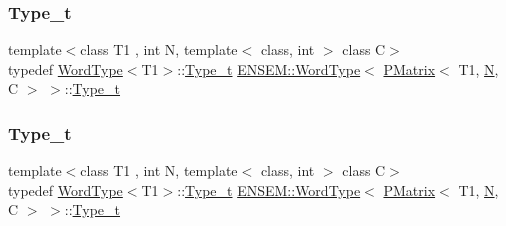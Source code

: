 \subsubsection{\texorpdfstring{Type\_t}{Type\_t}\hspace{0.1cm}{\footnotesize\ttfamily [1/3]}}
{\footnotesize\ttfamily template$<$class T1 , int N, template$<$ class, int $>$ class C$>$ \\
typedef \mbox{\hyperlink{structENSEM_1_1WordType}{Word\+Type}}$<$T1$>$\+::\mbox{\hyperlink{structENSEM_1_1WordType_3_01PMatrix_3_01T1_00_01N_00_01C_01_4_01_4_a892bcf86195d7872e78b5a8b6a1e1734}{Type\+\_\+t}} \mbox{\hyperlink{structENSEM_1_1WordType}{E\+N\+S\+E\+M\+::\+Word\+Type}}$<$ \mbox{\hyperlink{classENSEM_1_1PMatrix}{P\+Matrix}}$<$ T1, \mbox{\hyperlink{adat__devel_2lib_2hadron_2operator__name__util_8cc_a7722c8ecbb62d99aee7ce68b1752f337}{N}}, C $>$ $>$\+::\mbox{\hyperlink{structENSEM_1_1WordType_3_01PMatrix_3_01T1_00_01N_00_01C_01_4_01_4_a892bcf86195d7872e78b5a8b6a1e1734}{Type\+\_\+t}}}

\mbox{\label{structENSEM_1_1WordType_3_01PMatrix_3_01T1_00_01N_00_01C_01_4_01_4_a892bcf86195d7872e78b5a8b6a1e1734}} 
\subsubsection{\texorpdfstring{Type\_t}{Type\_t}\hspace{0.1cm}{\footnotesize\ttfamily [2/3]}}
{\footnotesize\ttfamily template$<$class T1 , int N, template$<$ class, int $>$ class C$>$ \\
typedef \mbox{\hyperlink{structENSEM_1_1WordType}{Word\+Type}}$<$T1$>$\+::\mbox{\hyperlink{structENSEM_1_1WordType_3_01PMatrix_3_01T1_00_01N_00_01C_01_4_01_4_a892bcf86195d7872e78b5a8b6a1e1734}{Type\+\_\+t}} \mbox{\hyperlink{structENSEM_1_1WordType}{E\+N\+S\+E\+M\+::\+Word\+Type}}$<$ \mbox{\hyperlink{classENSEM_1_1PMatrix}{P\+Matrix}}$<$ T1, \mbox{\hyperlink{adat__devel_2lib_2hadron_2operator__name__util_8cc_a7722c8ecbb62d99aee7ce68b1752f337}{N}}, C $>$ $>$\+::\mbox{\hyperlink{structENSEM_1_1WordType_3_01PMatrix_3_01T1_00_01N_00_01C_01_4_01_4_a892bcf86195d7872e78b5a8b6a1e1734}{Type\+\_\+t}}}


